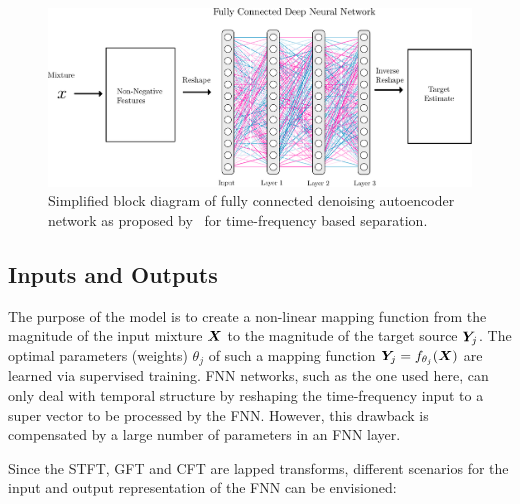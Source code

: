 \begin{figure}[ht!]
\centering
        \includegraphics[width=\textwidth]{Chapters/06_Separation_Unknown/figures/uhlich_dnn.pdf}
\caption{Simplified block diagram of fully connected denoising autoencoder network as proposed by~\cite{uhlich15} for time-frequency based separation.}
\label{fig:cft_dnn}
\end{figure}

\subsection{Inputs and Outputs}

The purpose of the model is to create a non-linear mapping function from the magnitude of the input mixture \({\bm{X}}\) to the magnitude of the target source \({\bm{Y}}_j\).
The optimal parameters (weights) \(\theta_j\) of such a mapping function \({\bm{Y}}_j = f_{\theta_j}({\bm{X}})\) are learned via supervised training.
FNN networks, such as the one used here, can only deal with temporal structure by reshaping the time-frequency input to a super vector to be processed by the FNN. 
However, this drawback is compensated by a large number of parameters in an FNN layer.

Since the STFT, GFT and CFT are lapped transforms, different scenarios for the input and output representation of the FNN can be envisioned:

